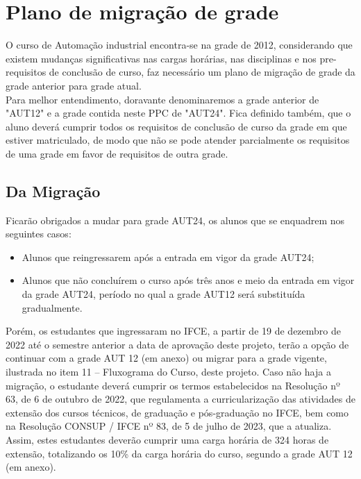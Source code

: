 \chapter{Plano de migração de grade}

O curso de Automação industrial encontra-se na grade de 2012, considerando que existem mudanças significativas nas cargas horárias, nas disciplinas e nos pre-requisitos de conclusão de curso, faz necessário um plano de migração de grade da grade anterior para grade atual.\\


Para melhor entendimento, doravante denominaremos a grade anterior de "AUT12" e a grade contida neste PPC de "AUT24". Fica definido também, que o aluno deverá cumprir todos os requisitos de conclusão de curso da grade em que estiver matriculado, de modo que não se pode atender parcialmente os requisitos de uma grade em favor de requisitos de outra grade.

\section{Da Migração}

Ficarão obrigados a mudar para grade AUT24, os alunos que se enquadrem nos seguintes casos:

\begin{itemize}
\item Alunos que reingressarem após a entrada em vigor da grade AUT24;
\item Alunos que não concluírem o curso após três anos e meio da entrada em vigor da grade AUT24, período no qual a grade AUT12 será substituída gradualmente.
\end{itemize}

Porém, os estudantes que ingressaram no IFCE, a partir de 19 de dezembro de 2022 até o semestre anterior a data de aprovação deste projeto, terão a opção de continuar com a grade AUT 12 (em anexo) ou migrar para a grade vigente, ilustrada no item 11 – Fluxograma do Curso, deste projeto. Caso não haja a migração, o estudante deverá cumprir os termos estabelecidos na Resolução nº 63, de 6 de outubro de 2022, que regulamenta a curricularização das atividades de extensão dos cursos técnicos, de graduação e pós-graduação no IFCE, bem como na Resolução CONSUP / IFCE nº 83, de 5 de julho de 2023, que a atualiza. Assim, estes estudantes deverão cumprir uma carga horária de 324 horas de extensão, totalizando os 10\% da carga horária do curso, segundo a grade AUT 12 (em anexo).\\ 

